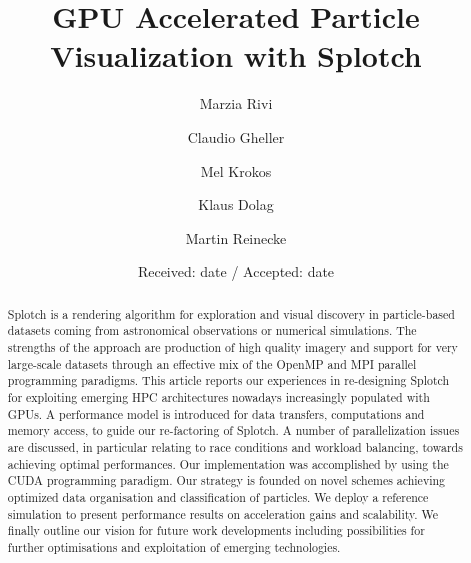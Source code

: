 \documentclass[smallextended]{svjour3}
\begin{document}
\title{GPU Accelerated Particle Visualization with Splotch}
\author{Marzia Rivi \and
	Claudio Gheller \and
	Mel Krokos  \and
	Klaus Dolag \and
        Martin Reinecke
}


\date{Received: date / Accepted: date}
\maketitle

\begin{abstract}
Splotch is a rendering algorithm for exploration and visual discovery in
particle-based datasets coming from astronomical observations or
numerical simulations. The strengths of the approach are production of
high quality imagery and support for very large-scale datasets through an
effective mix of the OpenMP and MPI parallel programming paradigms. This
article reports our experiences in re-designing Splotch for exploiting
emerging HPC architectures nowadays increasingly populated with GPUs. A
performance model is introduced for data transfers, computations and
memory access, to guide our re-factoring of Splotch.  A number of
parallelization issues are discussed, in particular relating to race
conditions and workload balancing, towards achieving optimal
performances. Our implementation was accomplished by using the CUDA
programming paradigm. Our strategy is founded on novel schemes achieving optimized data organisation and classification of particles. We deploy a reference simulation to present
performance results on acceleration gains and scalability. We finally
outline our vision for future work developments including possibilities
for further optimisations and exploitation of emerging technologies.

\end{abstract}
 
\end{document}
